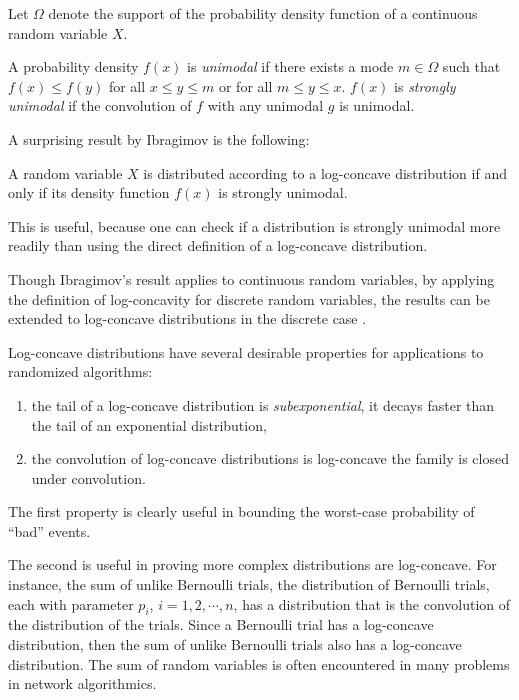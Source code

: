 Let $\Omega$ denote the support of the probability density function of a continuous random variable
$X$.
\begin{defn}
A probability density $f(x)$ is \textit{unimodal} if there exists a mode $m \in \Omega$ such that $f(x) \le f(y)$ for all
$x \le y \le m$ or for all $m \le y \le x$. $f(x)$ is \textit{strongly unimodal} if the convolution of $f$ with any
unimodal $g$ is unimodal.
\label{defn:unimodal}
\end{defn}
A surprising result by Ibragimov \cite{Ibragimov65LogUnimodal} is the following:
\begin{thm}
A random variable $X$ is distributed according to a log-concave distribution if and only if its
density function $f(x)$ is strongly unimodal.
\label{thm:log_concave_unimodal}
\end{thm}
\noindent
This is useful, because one can check if a distribution is strongly unimodal more readily than using the
direct definition of a log-concave distribution.

Though Ibragimov's result applies to continuous random variables, by applying the definition of
log-concavity for discrete random variables, the results can be extended to log-concave distributions
in the discrete case \cite[Theorem 3]{Keilson71DiscreteUni}.

Log-concave distributions have several desirable properties for applications to randomized algorithms:
\begin{enumerate}
\item the tail of a log-concave distribution is \textit{subexponential}, \ie it decays faster than the tail of an
exponential distribution,
\item the convolution of log-concave distributions is log-concave \ie the family is closed under convolution.
\end{enumerate}
The first property is clearly useful in bounding the worst-case probability of ``bad'' events. 

The second is useful in proving more complex distributions are log-concave. For instance, the sum of unlike Bernoulli
trials, \ie the distribution of Bernoulli trials, each with parameter $p_i$, $i = 1,2,\cdots,n$, has a 
distribution that is the convolution of the distribution of the trials. Since a Bernoulli trial has a log-concave
distribution, then the sum of unlike Bernoulli trials also has a log-concave distribution. The sum of 
random variables is often encountered in many problems in network algorithmics.

